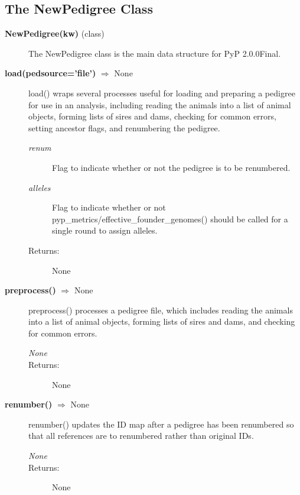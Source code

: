 \subsection*{The NewPedigree Class}
\begin{description}
\item[\textbf{NewPedigree(kw)} (class)]
The NewPedigree class is the main data structure for PyP 2.0.0Final.

\item[\textbf{load(pedsource='file')} $\Rightarrow$ None]
load() wraps several processes useful for loading and preparing a pedigree for use in an analysis, including reading the animals into a list of animal objects, forming lists of sires and dams, checking for common errors, setting ancestor flags, and renumbering the pedigree.
\begin{description}
\item[\emph{renum}] Flag to indicate whether or not the pedigree is to be renumbered.
\item[\emph{alleles}] Flag to indicate whether or not pyp\_metrics/effective\_founder\_genomes() should be called for a single round to assign alleles.
\item[Returns:] None
\end{description}

\item[\textbf{preprocess()} $\Rightarrow$ None]
preprocess() processes a pedigree file, which includes reading the animals into a list of animal objects, forming lists of sires and dams, and checking for common errors.
\begin{description}
\item[\emph{None}]
\item[Returns:] None
\end{description}

\item[\textbf{renumber()} $\Rightarrow$ None]
renumber() updates the ID map after a pedigree has been renumbered so that all references are to renumbered rather than original IDs.
\begin{description}
\item[\emph{None}]
\item[Returns:] None
\end{description}


\end{description}
